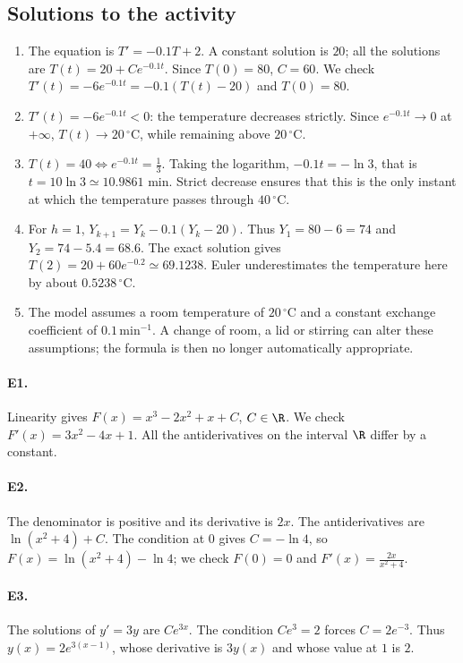 \subsection{Solutions to the activity}\begin{enumerate}
\item The equation is $T'=-\num{0,1}T+2$. A constant solution is $20$; all the solutions are $T(t)=20+Ce^{-\num{0,1}t}$. Since $T(0)=80$, $C=60$. We check $T'(t)=-6e^{-\num{0,1}t}=-\num{0,1}(T(t)-20)$ and $T(0)=80$.
\item $T'(t)=-6e^{-\num{0,1}t}<0$: the temperature decreases strictly. Since $e^{-\num{0,1}t}\to0$ at $+\infty$, $T(t)\to20\,^{\circ}\mathrm C$, while remaining above $20\,^{\circ}\mathrm C$.
\item $T(t)=40\Longleftrightarrow e^{-\num{0,1}t}=\frac{1}{3}$. Taking the logarithm, $-\num{0,1}t=-\ln3$, that is $t=10\ln3\simeq\num{10,9861}$ min. Strict decrease ensures that this is the only instant at which the temperature passes through $40\,^{\circ}\mathrm C$.
\item For $h=1$, $Y_{k+1}=Y_k-\num{0,1}(Y_k-20)$. Thus $Y_1=80-6=74$ and $Y_2=74-\num{5,4}=\num{68,6}$. The exact solution gives $T(2)=20+60e^{-\num{0,2}}\simeq\num{69,1238}$. Euler underestimates the temperature here by about $\num{0,5238}\,^{\circ}\mathrm C$.
\item The model assumes a room temperature of $20\,^{\circ}\mathrm C$ and a constant exchange coefficient of $\num{0,1}\,\mathrm{min}^{-1}$. A change of room, a lid or stirring can alter these assumptions; the formula is then no longer automatically appropriate.
\end{enumerate}

\paragraph{E1.}Linearity gives $F(x)=x^3-2x^2+x+C$, $C\in\R$. We check $F'(x)=3x^2-4x+1$. All the antiderivatives on the interval $\R$ differ by a constant.

\paragraph{E2.}The denominator is positive and its derivative is $2x$. The antiderivatives are $\ln(x^2+4)+C$. The condition at $0$ gives $C=-\ln4$, so $F(x)=\ln(x^2+4)-\ln4$; we check $F(0)=0$ and $F'(x)=\frac{2x}{x^2+4}$.

\paragraph{E3.}The solutions of $y'=3y$ are $Ce^{3x}$. The condition $Ce^3=2$ forces $C=2e^{-3}$. Thus $y(x)=2e^{3(x-1)}$, whose derivative is $3y(x)$ and whose value at $1$ is $2$.

